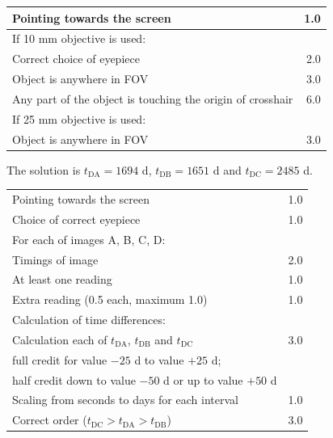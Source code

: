 \begin{center}
\begin{tabular}{l r}
\hline
Pointing towards the screen & 1.0 \\
\hline
\multicolumn{2}{l}{If 10 mm objective is used:} \\
\quad Correct choice of eyepiece & 2.0 \\
\quad Object is anywhere in FOV & 3.0 \\
\quad Any part of the object is touching the origin of crosshair & 6.0 \\
\hline
\multicolumn{2}{l}{If 25 mm objective is used:} \\
\quad Object is anywhere in FOV & 3.0 \\
\hline
\end{tabular}
\end{center}

The solution is $t_{\mathrm{DA}} = 1694$ d, $t_{\mathrm{DB}} = 1651$ d and
$t_{\mathrm{DC}} = 2485$ d.

\begin{center}
\begin{tabular}{l r}
\hline
Pointing towards the screen & 1.0 \\
Choice of correct eyepiece & 1.0 \\
\hline
\multicolumn{2}{l}{For each of images A, B, C, D:} \\
\quad Timings of image & 2.0 \\
\qquad At least one reading & 1.0 \\
\qquad Extra reading (0.5 each, maximum 1.0) & 1.0 \\
\hline
\multicolumn{2}{l}{Calculation of time differences:} \\
\quad Calculation each of $t_{\mathrm{DA}}$, $t_{\mathrm{DB}}$ and
  $t_{\mathrm{DC}}$ & 3.0 \\
\qquad full credit for value $-25$ d to value $+25$ d; & \\
\qquad half credit down to value $-50$ d or up to value $+50$ d & \\
\quad Scaling from seconds to days for each interval & 1.0 \\
\hline
Correct order ($t_{\mathrm{DC}} > t_{\mathrm{DA}} > t_{\mathrm{DB}}$) & 3.0 \\
\hline
\end{tabular}
\end{center}

